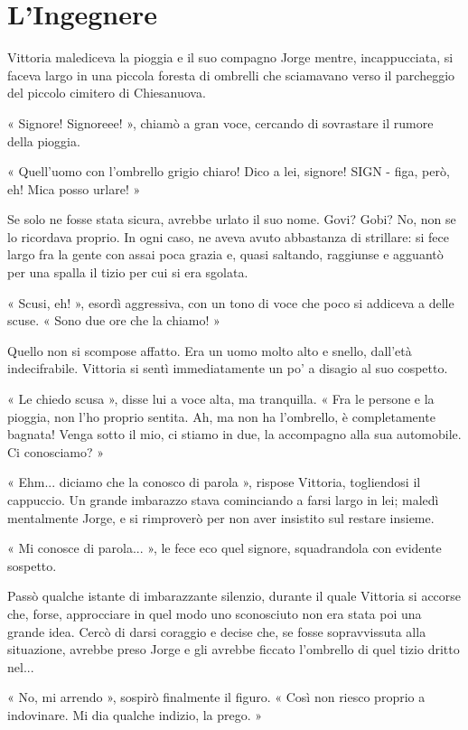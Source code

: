 \chapter{L'Ingegnere}


Vittoria malediceva la pioggia e il suo compagno Jorge mentre, incappucciata, si faceva largo in una piccola foresta di ombrelli che sciamavano verso il parcheggio del piccolo cimitero di Chiesanuova.

« Signore! Signoreee! », chiamò a gran voce, cercando di sovrastare il rumore della pioggia.

« Quell'uomo con l'ombrello grigio chiaro! Dico a lei, signore! SIGN - figa, però, eh! Mica posso urlare! »

Se solo ne fosse stata sicura, avrebbe urlato il suo nome. Govi? Gobi? No, non se lo ricordava proprio. In ogni caso, ne aveva avuto abbastanza di strillare: si fece largo fra la gente con assai poca grazia e, quasi saltando, raggiunse e agguantò per una spalla il tizio per cui si era sgolata.

« Scusi, eh! », esordì aggressiva, con un tono di voce che poco si addiceva a delle scuse. « Sono due ore che la chiamo! »

Quello non si scompose affatto. Era un uomo molto alto e snello, dall'età indecifrabile. Vittoria si sentì immediatamente un po' a disagio al suo cospetto.

« Le chiedo scusa », disse lui a voce alta, ma tranquilla. « Fra le persone e la pioggia, non l'ho proprio sentita. Ah, ma non ha l'ombrello, è completamente bagnata! Venga sotto il mio, ci stiamo in due, la accompagno alla sua automobile. Ci conosciamo? »

« Ehm... diciamo che la conosco di parola », rispose Vittoria, togliendosi il cappuccio. Un grande imbarazzo stava cominciando a farsi largo in lei; maledì mentalmente Jorge, e si rimproverò per non aver insistito sul restare insieme.

« Mi conosce di parola... », le fece eco quel signore, squadrandola con evidente sospetto.

Passò qualche istante di imbarazzante silenzio, durante il quale Vittoria si accorse che, forse, approcciare in quel modo uno sconosciuto non era stata poi una grande idea. Cercò di darsi coraggio e decise che, se fosse sopravvissuta alla situazione, avrebbe preso Jorge e gli avrebbe ficcato l'ombrello di quel tizio dritto nel...

« No, mi arrendo », sospirò finalmente il figuro. « Così non riesco proprio a indovinare. Mi dia qualche indizio, la prego. »

